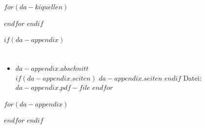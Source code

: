 \documentclass[
    headings=optiontotocandhead,%
    twoside,
    numbers=noenddot,%
    12pt, %
    titlepage, %
    parskip=full, %
    listof=leveldown, 
    numbers=noenddot, %
    a4paper,DIV=14,
    BCOR=15mm,
]{scrbook}
\makeatletter
\newcommand*{\the@orig@section}{}
\let\the@orig@section\section
\renewcommand*{\section}{%
  \clearpage
  \the@orig@section
}
\makeatother
\begin{document}
$for(da-kiquellen)$
{}
%
%
$endfor$
$endif$

$if(da-appendix)$


\translatelet{}
\section{\app}

\begin{itemize}

$for(da-appendix)$
\item \textbf{$da-appendix.abschnitt$}\\ $if(da-appendix.seiten)$ $da-appendix.seiten$  $endif$ Datei: \texttt{$da-appendix.pdf-file$}
$endfor$
\end{itemize}


$for(da-appendix)$
{}
%
%
$endfor$
$endif$
\end{document}
